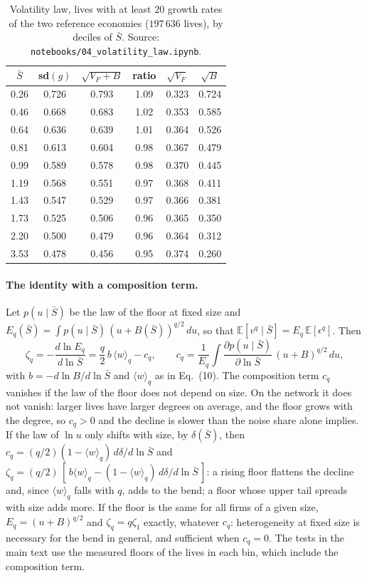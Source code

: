 \documentclass[pre,onecolumn,superscriptaddress,nofootinbib]{revtex4-2}
\newcommand{\E}{\mathbb E}
\newcommand{\Sb}{\bar S}
\begin{document}
\begin{table}[h]
\caption{Volatility law, lives with at least $20$ growth rates of the two reference economies
($197\,636$ lives), by deciles of $\Sb$.  Source: \texttt{notebooks/04\_volatility\_law.ipynb}.}
\label{tab:law}
\begin{ruledtabular}
\begin{tabular}{cccccc}
$\Sb$ & sd$(g)$ & $\sqrt{V_F+B}$ & ratio & $\sqrt{V_F}$ & $\sqrt B$\\
\hline
0.26 & 0.726 & 0.793 & 1.09 & 0.323 & 0.724\\
0.46 & 0.668 & 0.683 & 1.02 & 0.353 & 0.585\\
0.64 & 0.636 & 0.639 & 1.01 & 0.364 & 0.526\\
0.81 & 0.613 & 0.604 & 0.98 & 0.367 & 0.479\\
0.99 & 0.589 & 0.578 & 0.98 & 0.370 & 0.445\\
1.19 & 0.568 & 0.551 & 0.97 & 0.368 & 0.411\\
1.43 & 0.547 & 0.529 & 0.97 & 0.366 & 0.381\\
1.73 & 0.525 & 0.506 & 0.96 & 0.365 & 0.350\\
2.20 & 0.500 & 0.479 & 0.96 & 0.364 & 0.312\\
3.53 & 0.478 & 0.456 & 0.95 & 0.374 & 0.260\\
\end{tabular}
\end{ruledtabular}
\end{table}

\paragraph{The identity with a composition term.}  Let $p(u\mid\Sb)$ be the law of the floor at fixed
size and $E_q(\Sb)=\int p(u\mid\Sb)\,(u+B(\Sb))^{q/2}\,du$, so that $\E[v^q\mid\Sb]=E_q\,\E[\epsilon^q]$.  Then
\begin{equation}
\zeta_q=-\frac{d\ln E_q}{d\ln\Sb}=\frac q2\,b\,\langle w\rangle_q-c_q,\qquad
c_q=\frac{1}{E_q}\int\frac{\partial p(u\mid\Sb)}{\partial\ln\Sb}\,(u+B)^{q/2}\,du ,
\label{eq:identity}
\end{equation}
with $b=-d\ln B/d\ln\Sb$ and $\langle w\rangle_q$ as in Eq.~(10).  The composition term $c_q$ vanishes if the
law of the floor does not depend on size.  On the network it does not vanish: larger lives have
larger degrees on average, and the floor grows with the degree, so $c_q>0$ and the decline is slower
than the noise share alone implies.  If the law of $\ln u$ only shifts with size, by $\delta(\Sb)$, then
$c_q=(q/2)(1-\langle w\rangle_q)\,d\delta/d\ln\Sb$ and $\zeta_q=(q/2)\,[\,b\langle w\rangle_q-(1-\langle w\rangle_q)\,d\delta/d\ln\Sb\,]$: a
rising floor flattens the decline and, since $\langle w\rangle_q$ falls with $q$, adds to the bend; a floor whose upper
tail spreads with size adds more.  If the floor is the same for all firms of a given size, $E_q=(u+B)^{q/2}$
and $\zeta_q=q\zeta_1$ exactly, whatever $c_q$: heterogeneity at fixed size is necessary for the bend in
general, and sufficient when $c_q=0$.  The tests in the main text use the measured floors of the lives in
each bin, which include the composition term.
\end{document}
